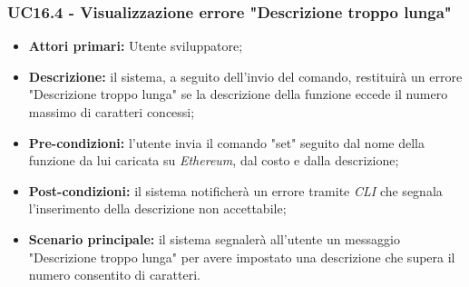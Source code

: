 \subsubsection{UC16.4 - Visualizzazione errore "Descrizione troppo lunga"}
\begin{itemize}
	\item \textbf{Attori primari:} Utente sviluppatore;
	\item \textbf{Descrizione:} il sistema, a seguito dell'invio del comando, restituirà un errore "Descrizione troppo lunga" se la descrizione della funzione eccede il numero massimo di caratteri concessi;
	\item \textbf{Pre-condizioni:}  l'utente invia il comando "set" seguito dal nome della funzione da lui caricata su \textit{Ethereum}, dal costo e dalla descrizione;
	\item \textbf{Post-condizioni:} il sistema notificherà un errore tramite \textit{CLI\glo} che segnala l'inserimento della descrizione non accettabile;
	\item \textbf{Scenario principale:} il sistema segnalerà all'utente un messaggio "Descrizione troppo lunga" per avere impostato una descrizione che supera il numero consentito di caratteri.
\end{itemize}